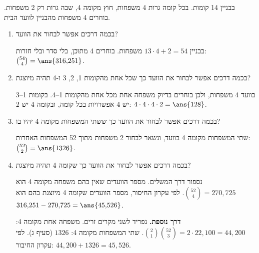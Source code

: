 בבניין 14 קומות. בכל קומה גרות 4 משפחות, חוץ מקומה 4, שבה גרות רק 2 משפחות. בוחרים 4 משפחות מהבניין לוועד הבית.
\begin{enumerate}
\item בכמה דרכים אפשר לבחור את הוועד?
\begin{solbox}
בבניין $13\cdot4+2=54$ משפחות. בוחרים 4 מתוכן, בלי סדר ובלי חזרות: $\binom{54}4=\ans{316{,}251}$.
\end{solbox}
\item בכמה דרכים אפשר לבחור את הוועד כך שכל אחת מהקומות 1, 2, 3 ו-4 תהיה מיוצגת?
\begin{solbox}
בוועד 4 משפחות, ולכן בוחרים בדיוק משפחה אחת מכל אחת מהקומות 1--4. בקומות 1--3 יש 4 אפשרויות בכל קומה, ובקומה 4 יש 2: $4\cdot4\cdot4\cdot2=\ans{128}$.
\end{solbox}
\item בכמה דרכים אפשר לבחור את הוועד כך ששתי המשפחות מקומה 4 יהיו בו?
\begin{solbox}
שתי המשפחות מקומה 4 בוועד, ונשאר לבחור 2 משפחות מתוך 52 המשפחות האחרות: $\binom{52}2=\ans{1326}$.
\end{solbox}
\item בכמה דרכים אפשר לבחור את הוועד כך שקומה 4 תהיה מיוצגת?
\begin{solbox}
נספור דרך המשלים. מספר הוועדים שאין בהם משפחה מקומה 4 הוא $\binom{52}4=270{,}725$. לפי עקרון החיסור, מספר הוועדים שקומה 4 מיוצגת בהם הוא $316{,}251-270{,}725=\ans{45{,}526}$.

\textbf{דרך נוספת.} נפריד לשני מקרים זרים. משפחה אחת מקומה 4: $\binom21\binom{52}3=2\cdot22{,}100=44{,}200$. שתי המשפחות מקומה 4: $1326$ (סעיף ג). לפי עקרון החיבור: $44{,}200+1326=45{,}526$.
\end{solbox}
\end{enumerate}
